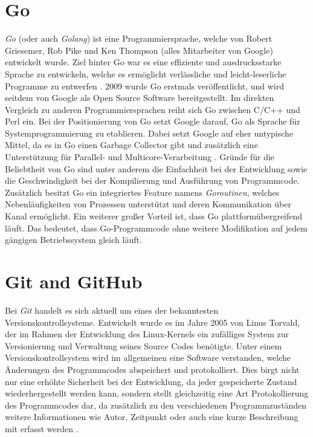 \section{Go}
\textit{Go} (oder auch \textit{Golang}) ist eine Programmiersprache, welche von
Robert Griesemer, Rob Pike und Ken Thompson (alles Mitarbeiter
von Google) entwickelt wurde. Ziel hinter Go war es eine effiziente und ausdrucksstarke Sprache zu entwickeln, welche es ermöglicht verlässliche und
leicht-leserliche Programme zu entwerfen \autocite{donovan_kernighan_2016}.
2009 wurde Go erstmals veröffentlicht, und wird seitdem von Google als Open Source
Software bereitgestellt. \newline
Im direkten Vergleich zu anderen Programmiersprachen reiht sich Go zwischen
C/C++ und Perl ein. Bei der Positionierung von Go setzt Google darauf, Go als
Sprache für Systemprogrammierung zu etablieren. Dabei setzt Google auf eher
untypische Mittel, da es in Go einen Garbage Collector gibt und zusätzlich eine
Unterstützung für Parallel- und Multicore-Verarbeitung
\autocite{feike_blass_2012}. \newline 
Gründe für die Beliebtheit von Go sind unter anderem die Einfachheit bei der
Entwicklung sowie die Geschwindigkeit bei der Kompilierung und
Ausführung von Programmcode. Zusätzlich besitzt Go ein integriertes Feature namens
\textit{Goroutinen}, welches Nebenläufigkeiten von Prozessen unterstützt und
deren Kommunikation über Kanal ermöglicht. 
Ein weiterer großer Vorteil ist, dass Go plattformübergreifend läuft. Das bedeutet,
dass Go-Programmcode ohne weitere Modifikation auf jedem gängigen Betriebssystem gleich
läuft.
\autocite{donovan_kernighan_2016}


\section{Git and GitHub}
Bei \textit{Git} handelt es sich aktuell um eines der bekanntesten
Versionskontrollsysteme. Entwickelt wurde es im Jahre 2005 von Linus Torvald,
der im Rahmen der Entwicklung des Linux-Kernels ein zufälliges System zur
Versionierung und Verwaltung seines Source Codes benötigte. Unter einem
Versionskontrollsystem wird im allgemeinen eine Software verstanden, welche
Änderungen des Programmcodes abspeichert und protokolliert. Dies birgt nicht nur
eine erhöhte Sicherheit bei der Entwicklung, da jeder gespeicherte Zustand
wiederhergestellt werden kann, sondern stellt gleichzeitig eine Art
Protokollierung des Programmcodes dar, da zusätzlich zu den verschiedenen
Programmzuständen weitere Informationen wie Autor, Zeitpunkt oder auch eine
kurze Beschreibung mit erfasst werden \autocite{preissel_stachmann_2017}. \hfill
\break 

